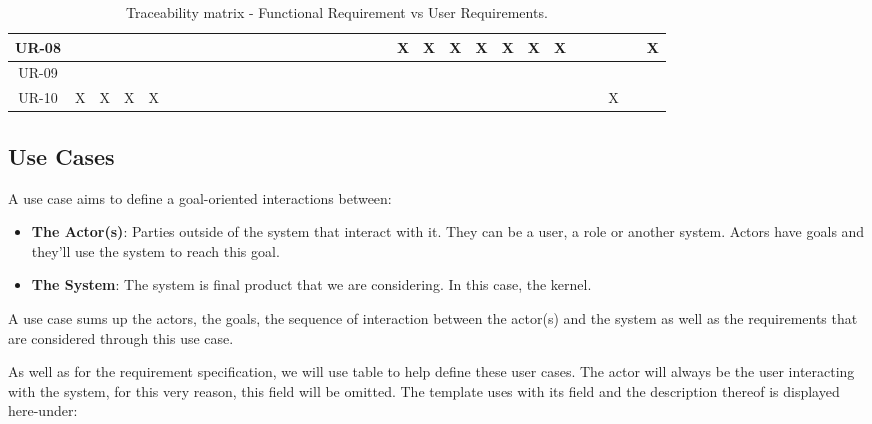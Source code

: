 \begin{table}
\begin{adjustbox}{max width=\textwidth}
\begin{tabular}{| c | *{32}{c}|}
    UR-08   &       &       &       &       &       &       &       &       &       &       &       &       &       &       &       &       &       &       &       &       & X     & X     & X     & X     & X     & X     & X     &       &       &       &       & X       \\ \hline
    UR-09   &       &       &       &       &       &       &       &       &       &       &       &       &       &       &       &       &       &       &       &       &       &       &       &       &       &       &       &       &       &       &       &         \\ \hline
    UR-10   & X     & X     & X     & X     &       &       &       &       &       &       &       &       &       &       &       &       &       &       &       &       &       &       &       &       &       &       &       &       &       & X     &       &        \\ \hline
        \end{tabular}
        \end{adjustbox}                                                                        
\caption{Traceability matrix - Functional Requirement vs User Requirements.}
\label{T:traceability_matrix_fr_vs_ur}
\end{table}


\subsection{Use Cases}\label{chapter4_use_cases}
A use case aims to define a goal-oriented interactions between:
\begin{itemize}
\item\textbf{The Actor(s)}: Parties outside of the system that interact with it. They can be a user, a role or another system. Actors have goals and they'll use the system to reach this goal.
\item\textbf{The System}: The system is final product that we are considering. In this case, the kernel.
\end{itemize}

A use case sums up the actors, the goals, the sequence of interaction between the actor(s) and the system as well as the requirements that are considered through this use case.

As well as for the requirement specification, we will use table to help define these user cases. The actor will always be the user interacting with the system, for this very reason, this field will be omitted. The template uses with its field and the description thereof is displayed here-under:


